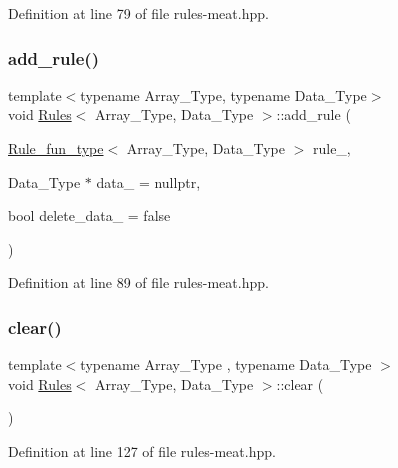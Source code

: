 Definition at line 79 of file rules-\/meat.\+hpp.

\mbox{\label{class_rules_abbc63747014445b538384bb500464bb5}} 
\subsubsection{\texorpdfstring{add\+\_\+rule()}{add\_rule()}\hspace{0.1cm}{\footnotesize\ttfamily [3/3]}}
{\footnotesize\ttfamily template$<$typename Array\+\_\+\+Type, typename Data\+\_\+\+Type$>$ \\
void \hyperlink{class_rules}{Rules}$<$ Array\+\_\+\+Type, Data\+\_\+\+Type $>$\+::add\+\_\+rule (\begin{DoxyParamCaption}\item[{\hyperlink{typedefs_8hpp_a99982bdca40c23ca6f901c8e66da78a1}{Rule\+\_\+fun\+\_\+type}$<$ Array\+\_\+\+Type, Data\+\_\+\+Type $>$}]{rule\+\_\+,  }\item[{Data\+\_\+\+Type $\ast$}]{data\+\_\+ = {\ttfamily nullptr},  }\item[{bool}]{delete\+\_\+data\+\_\+ = {\ttfamily false} }\end{DoxyParamCaption})\hspace{0.3cm}{\ttfamily [inline]}}



Definition at line 89 of file rules-\/meat.\+hpp.

\mbox{\label{class_rules_a135a15d3ff70d4350d76a15f8e85f7df}} 
\subsubsection{\texorpdfstring{clear()}{clear()}}
{\footnotesize\ttfamily template$<$typename Array\+\_\+\+Type , typename Data\+\_\+\+Type $>$ \\
void \hyperlink{class_rules}{Rules}$<$ Array\+\_\+\+Type, Data\+\_\+\+Type $>$\+::clear (\begin{DoxyParamCaption}{ }\end{DoxyParamCaption})\hspace{0.3cm}{\ttfamily [inline]}}



Definition at line 127 of file rules-\/meat.\+hpp.

